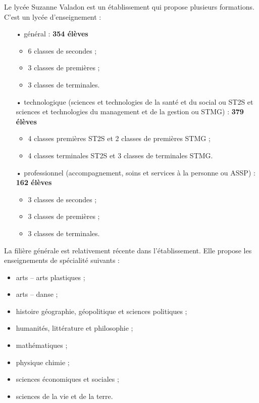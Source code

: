 \documentclass[12pt,a4paper]{article}
\begin{document}
Le lycée Suzanne Valadon est un établissement qui propose plusieurs formations.
C'est un lycée d'enseignement :
\begin{itemize}
\item[•] général : \hfill \textbf{354 élèves}
\begin{itemize}
\item 6 classes de secondes ;
\item 3 classes de premières ;
\item 3 classes de terminales.
\end{itemize}
\item[•] technologique (sciences et technologies de la santé et du social ou ST2S et sciences et technologies du management et de la gestion ou STMG) : \hfill \textbf{379 élèves}
\begin{itemize}
\item 4 classes premières ST2S et 2 classes de premières STMG ;
\item 4 classes terminales ST2S et 3 classes de terminales STMG.
\end{itemize}
\item[•] professionnel (accompagnement, soins et services à la personne ou ASSP) : \hfill \textbf{162 élèves}
\begin{itemize}
\item 3 classes de secondes ;
\item 3 classes de premières ;
\item 3 classes de terminales.
\end{itemize}
\end{itemize}
La filière générale est relativement récente dans l'établissement.
Elle propose les enseignements de spécialité suivants : 
\begin{itemize}
\item arts -- arts plastiques ;
\item arts -- danse ;
\item histoire géographie, géopolitique et sciences politiques ;
\item humanités, littérature et philosophie ;
\item mathématiques ;
\item physique chimie ;
\item sciences économiques et sociales ;
\item sciences de la vie et de la terre.
\end{itemize}
\end{document}

